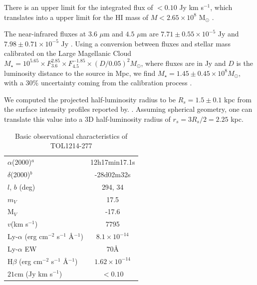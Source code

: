 \documentclass[a4,useAMS,usenatbib,usegraphicx]{mn2e}
\begin{document}
There is an upper limit for the  
integrated flux of $<0.10$ Jy km s$^{-1}$, which translates into a
upper limit for the HI mass of $M<2.65\times 10^{8}$ M$_{\odot}$
\citep{pustilnikmartin07}.  

The near-infrared fluxes at $3.6$ $\mu$m and $4.5$ $\mu$m are
$7.71\pm0.55\times 10^{-5}$ Jy and $7.98\pm0.71\times 10^{-5}$ Jy
\citep{2008ApJ...678..804E}.  Using a conversion between fluxes and
stellar mass calibrated on the Large Magellanic Cloud $M_{\star} =
10^{5.65} \times F_{3.6}^{2.85} \times F_{4.5}^{-1.85} \times
(D/0.05)^2 M_{\odot}$, where fluxes are in Jy and $D$ is the luminosity
distance to the source in Mpc, we find $M_{\star} = 1.45\pm0.45\times 10^{8}
M_{\odot}$, with a $30\%$ uncertainty coming from the calibration
process \citep{2012AJ....143..139E}.  


We computed the projected half-luminosity radius to be $R_s=1.5\pm0.1$ kpc 
from the surface intensity profiles reported by.
\citep{2003A&A...410..481N}. 
Assuming spherical geometry, one can translate this value into a 3D
half-luminosity radius of $r_s=3R_s/2=2.25$ kpc.



\begin{table}
\begin{center}
\begin{tabular}{lc}
$\alpha$(2000)$^{a}$ & 12h17min17.1s\\
$\delta$(2000)$^{b}$ & -28d02m32s\\
$l$, $b$ (deg) & 294, 34\\
$m_V$ & 17.5\\
  M$_V$ & -17.6\\ 
$v$(km s$^{-1}$) & 7795\\
Ly-$\alpha$ (erg cm$^{-2}$ s$^{-1}$ \AA$^{-1}$)& $8.1\times 10^{-14}$ \\
Ly-$\alpha$ EW & $70$\AA\\
H$\beta$ (erg cm$^{-2}$ s$^{-1}$ \AA$^{-1}$) & $1.62\times 10^{-14}$ \\
$21$cm (Jy km s$^{-1}$)& $<0.10$ \\
\end{tabular}
\end{center}
\caption{Basic observational characteristics of TOL1214-277
  \citep{Thuan97}\\} 
\end{table}
\end{document}
